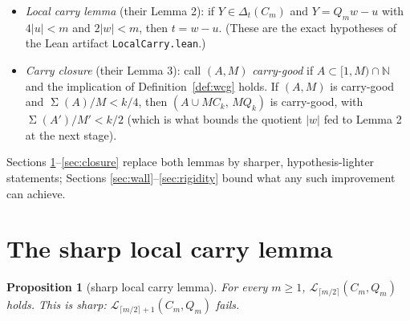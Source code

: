 \documentclass[11pt]{article}
\newtheorem{proposition}{Proposition}
\theoremstyle{definition}
\theoremstyle{remark}
\newcommand{\N}{\mathbb{N}}
\newcommand{\loc}[1]{\mathcal{L}_{#1}}
\DeclareMathOperator{\SSum}{\Sigma}
\begin{document}
\begin{itemize}
\item \emph{Local carry lemma} (their Lemma 2): if $Y\in\Delta_t(C_m)$ and
$Y=Q_mw-u$ with $4|u|<m$ and $2|w|<m$, then $t=w-u$. (These are the exact
hypotheses of the Lean artifact \texttt{LocalCarry.lean}.)
\item \emph{Carry closure} (their Lemma 3): call $(A,M)$ \emph{carry-good}
if $A\subset[1,M)\cap\N$ and the implication of Definition~\ref{def:wcg}
holds. If $(A,M)$ is carry-good and $\SSum(A)/M<k/4$, then
$(A\cup MC_k,\,MQ_k)$ is carry-good, with $\SSum(A')/M'<k/2$ (which is
what bounds the quotient $|w|$ fed to Lemma 2 at the next stage).
\end{itemize}

Sections \ref{sec:sharp}--\ref{sec:closure} replace both lemmas by
sharper, hypothesis-lighter statements; Sections
\ref{sec:wall}--\ref{sec:rigidity} bound what any such improvement can
achieve.

\section{The sharp local carry lemma}\label{sec:sharp}

\begin{proposition}[sharp local carry lemma]\label{prop:sharp}
For every $m\ge1$, $\loc{\lceil m/2\rceil}(C_m,Q_m)$ holds. This is sharp:
$\loc{\lceil m/2\rceil+1}(C_m,Q_m)$ fails.
\end{proposition}
\end{document}

